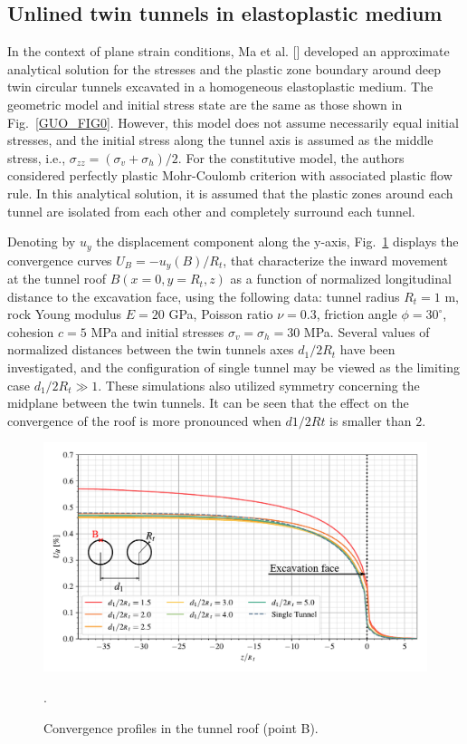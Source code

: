 \documentclass[a4paper,fleqn]{cas-sc}
\begin{document}
\subsection{Unlined twin tunnels in elastoplastic medium}\label{}

In the context of plane strain conditions, Ma et al. [] developed an approximate analytical solution for the stresses and the plastic zone boundary around deep twin circular tunnels excavated in a homogeneous elastoplastic medium. The geometric model and initial stress state are the same as those shown in Fig.~\ref{GUO_FIG0}. However, this model does not assume necessarily equal initial stresses, and the initial stress along the tunnel axis is assumed as the middle stress, i.e., $\sigma_{zz} = (\sigma_v+\sigma_h)/2$. For the constitutive model, the authors considered perfectly plastic Mohr-Coulomb criterion with associated plastic flow rule. In this analytical solution, it is assumed that the plastic zones around each tunnel are isolated from each other and completely surround each tunnel.

Denoting by $u_y$ the displacement component along the y-axis, Fig.~\ref{MA_convergence_profile_B} displays the convergence curves $U_B = -u_y(B)/R_t$, that characterize the inward movement at the tunnel roof $B(x = 0, y = R_t, z)$ as a function of normalized longitudinal distance to the excavation face, using the following data: tunnel radius $R_t = 1$ m, rock Young modulus $E =20$ GPa, Poisson ratio $\nu = 0.3$, friction angle $\phi = 30^\circ$, cohesion $c = 5$ MPa and initial stresses $\sigma_v = \sigma_h = 30$ MPa. Several values of normalized distances between the twin tunnels axes $d_1/2R_t$ have been investigated, and the configuration of single tunnel may be viewed as the limiting case $d_1/2R_t \gg 1$. These simulations also utilized symmetry concerning the midplane between the twin tunnels. It can be seen that the effect on the convergence of the roof is more pronounced when $d1/2Rt$ is smaller than $2$.

\begin{figure}[h!]
	\centering
	\includegraphics[scale=0.65]{MA_Convergence Profiles in B.pdf}
	\caption{Convergence profiles in the tunnel roof (point B).}.
	\label{MA_convergence_profile_B}
\end{figure}
\FloatBarrier
\end{document}
